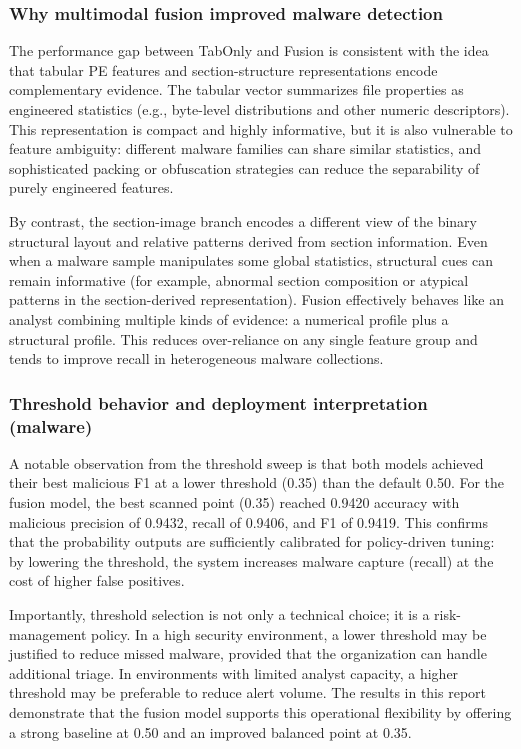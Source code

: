 \documentclass[conference]{IEEEtran}
\begin{document}
\subsubsection{Why multimodal fusion improved malware detection}

The performance gap between TabOnly and Fusion is consistent with the idea that tabular PE features and section-structure representations encode complementary evidence. The tabular vector summarizes file properties as engineered statistics (e.g., byte-level distributions and other numeric descriptors). This representation is compact and highly informative, but it is also vulnerable to feature ambiguity: different malware families can share similar statistics, and sophisticated packing or obfuscation strategies can reduce the separability of purely engineered features.

By contrast, the section-image branch encodes a different view of the binary structural layout and relative patterns derived from section information. Even when a malware sample manipulates some global statistics, structural cues can remain informative (for example, abnormal section composition or atypical patterns in the section-derived representation). Fusion effectively behaves like an analyst combining multiple kinds of evidence: a numerical profile plus a structural profile. This reduces over-reliance on any single feature group and tends to improve recall in heterogeneous malware collections.

\subsubsection{Threshold behavior and deployment interpretation (malware)}

A notable observation from the threshold sweep is that both models achieved their best malicious F1 at a lower threshold (0.35) than the default 0.50. For the fusion model, the best scanned point (0.35) reached 0.9420 accuracy with malicious precision of 0.9432, recall of 0.9406, and F1 of 0.9419. This confirms that the probability outputs are sufficiently calibrated for policy-driven tuning: by lowering the threshold, the system increases malware capture (recall) at the cost of higher false positives.

Importantly, threshold selection is not only a technical choice; it is a risk-management policy. In a high security environment, a lower threshold may be justified to reduce missed malware, provided that the organization can handle additional triage. In environments with limited analyst capacity, a higher threshold may be preferable to reduce alert volume. The results in this report demonstrate that the fusion model supports this operational flexibility by offering a strong baseline at 0.50 and an improved balanced point at 0.35.
\end{document}
